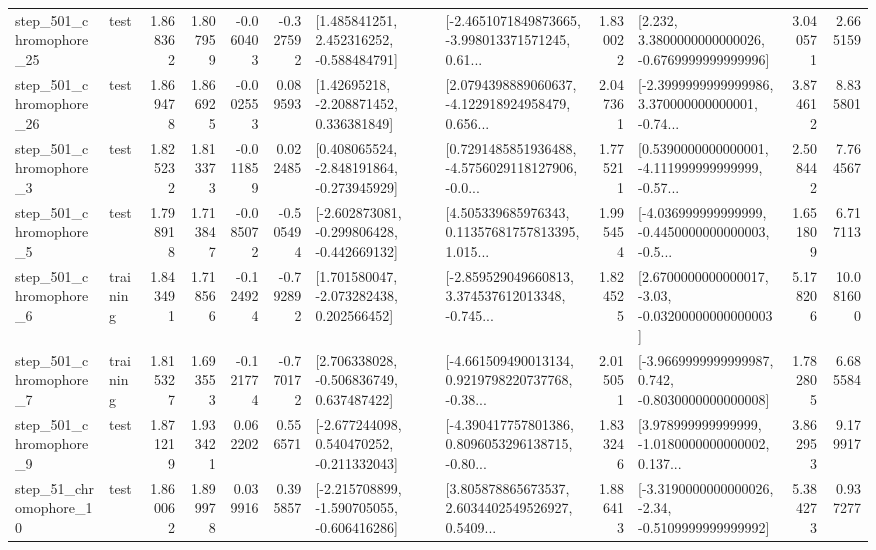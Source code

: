 \begin{tabular}{llrrrrllrlrr}
  step\_501\_chromophore\_25 &      test &      1.868362 &    1.807959 &     -0.060403 & -0.327592 &    [1.485841251, 2.452316252, -0.588484791] &  [-2.4651071849873665, -3.998013371571245, 0.61... &       1.830022 &   [2.232, 3.3800000000000026, -0.6769999999999996] &            3.040571 &          2.665159 \\
  step\_501\_chromophore\_26 &      test &      1.869478 &    1.866925 &     -0.002553 &  0.089593 &     [1.42695218, -2.208871452, 0.336381849] &  [2.0794398889060637, -4.122918924958479, 0.656... &       2.047361 &  [-2.3999999999999986, 3.370000000000001, -0.74... &            3.874612 &          8.835801 \\
   step\_501\_chromophore\_3 &      test &      1.825232 &    1.813373 &     -0.011859 &  0.022485 &   [0.408065524, -2.848191864, -0.273945929] &  [0.7291485851936488, -4.5756029118127906, -0.0... &       1.775211 &  [0.5390000000000001, -4.111999999999999, -0.57... &            2.508442 &          7.764567 \\
   step\_501\_chromophore\_5 &      test &      1.798918 &    1.713847 &     -0.085072 & -0.505494 &  [-2.602873081, -0.299806428, -0.442669132] &  [4.505339685976343, 0.11357681757813395, 1.015... &       1.995454 &  [-4.036999999999999, -0.4450000000000003, -0.5... &            1.651809 &          6.717113 \\
   step\_501\_chromophore\_6 &  training &      1.843491 &    1.718566 &     -0.124924 & -0.792892 &    [1.701580047, -2.073282438, 0.202566452] &  [-2.859529049660813, 3.374537612013348, -0.745... &       1.824525 &  [2.6700000000000017, -3.03, -0.03200000000000003] &            5.178206 &         10.081600 \\
   step\_501\_chromophore\_7 &  training &      1.815327 &    1.693553 &     -0.121774 & -0.770172 &    [2.706338028, -0.506836749, 0.637487422] &  [-4.661509490013134, 0.9219798220737768, -0.38... &       2.015051 &  [-3.9669999999999987, 0.742, -0.8030000000000008] &            1.782805 &          6.685584 \\
   step\_501\_chromophore\_9 &      test &      1.871219 &    1.933421 &      0.062202 &  0.556571 &   [-2.677244098, 0.540470252, -0.211332043] &  [-4.390417757801386, 0.8096053296138715, -0.80... &       1.833246 &  [3.978999999999999, -1.0180000000000002, 0.137... &            3.862953 &          9.179917 \\
   step\_51\_chromophore\_10 &      test &      1.860062 &    1.899978 &      0.039916 &  0.395857 &  [-2.215708899, -1.590705055, -0.606416286] &  [3.805878865673537, 2.6034402549526927, 0.5409... &       1.886413 &  [-3.3190000000000026, -2.34, -0.5109999999999992] &            5.384273 &          0.937277 \\

\end{tabular}
